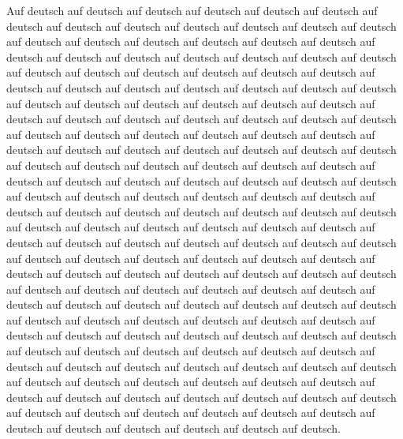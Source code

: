 \begin{zusammenfassung}
Auf deutsch  auf deutsch auf deutsch auf deutsch auf deutsch auf deutsch auf deutsch auf deutsch auf deutsch auf deutsch auf deutsch auf deutsch auf deutsch auf deutsch auf deutsch auf deutsch auf deutsch auf deutsch auf deutsch auf deutsch auf deutsch auf deutsch auf deutsch auf deutsch auf deutsch auf deutsch auf deutsch auf deutsch auf deutsch auf deutsch auf deutsch auf deutsch auf deutsch auf deutsch auf deutsch auf deutsch auf deutsch auf deutsch auf deutsch auf deutsch auf deutsch auf deutsch auf deutsch auf deutsch auf deutsch auf deutsch auf deutsch auf deutsch auf deutsch auf deutsch auf deutsch auf deutsch auf deutsch auf deutsch auf deutsch auf deutsch auf deutsch auf deutsch auf deutsch auf deutsch auf deutsch auf deutsch auf deutsch auf deutsch auf deutsch auf deutsch auf deutsch auf deutsch auf deutsch auf deutsch auf deutsch auf deutsch auf deutsch auf deutsch auf deutsch auf deutsch auf deutsch auf deutsch auf deutsch auf deutsch auf deutsch auf deutsch auf deutsch auf deutsch auf deutsch auf deutsch auf deutsch auf deutsch auf deutsch auf deutsch auf deutsch auf deutsch auf deutsch auf deutsch auf deutsch auf deutsch auf deutsch auf deutsch auf deutsch auf deutsch auf deutsch auf deutsch auf deutsch auf deutsch auf deutsch auf deutsch auf deutsch auf deutsch auf deutsch auf deutsch auf deutsch auf deutsch auf deutsch auf deutsch auf deutsch auf deutsch auf deutsch auf deutsch auf deutsch auf deutsch auf deutsch auf deutsch auf deutsch auf deutsch auf deutsch auf deutsch auf deutsch auf deutsch auf deutsch auf deutsch auf deutsch auf deutsch auf deutsch auf deutsch auf deutsch auf deutsch auf deutsch auf deutsch auf deutsch auf deutsch auf deutsch auf deutsch auf deutsch auf deutsch auf deutsch auf deutsch auf deutsch auf deutsch auf deutsch auf deutsch auf deutsch auf deutsch auf deutsch auf deutsch auf deutsch auf deutsch auf deutsch auf deutsch auf deutsch auf deutsch auf deutsch auf deutsch auf deutsch auf deutsch auf deutsch auf deutsch auf deutsch auf deutsch auf deutsch auf deutsch auf deutsch auf deutsch auf deutsch auf deutsch auf deutsch auf deutsch auf deutsch auf deutsch auf deutsch auf deutsch auf deutsch.
\newpage\thispagestyle{empty} %
\null %
\end{zusammenfassung}